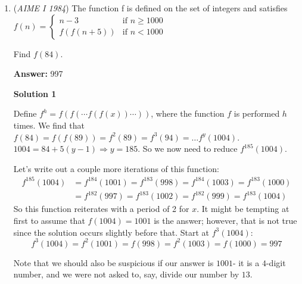 \begin{enumerate}
 Solution by \href{https://artofproblemsolving.com/wiki/index.php?title=User:A1b2}{a1b2}

 



\textbf{Solution 5 (Easy to understand)}

Notice that any line that passes through the bottom circle's center cuts it in half, so all we really care about are the top two circles. Suppose $\ell$ is the desired line. Draw lines $\ell_1$ and $\ell_2$ both parallel to $\ell$ such that $\ell_1$ passes through $(14,92)$ and $\ell_2$ passes through $(19,84)$. Clearly, $\ell$ must be the "average" of $\ell_1$ and $\ell_2$. Suppose $\ell:=y=mx+b, \ell_1:=y=mx+c, \ell_2:=y=mx+d$. Then $b=76-17m, c=92-14m, d=84-19m$. So we have that 
 \[76-17m=\frac{92-14m+84-19m}{2},\]which yields $m=-24$ for an answer of $\boxed{024}$.

 


	\item (\textit{AIME I 1984}) The function f is defined on the set of integers and satisfies
$f(n)= \begin{cases}  n-3 & \mbox{if }n\ge 1000 \\  f(f(n+5)) & \mbox{if }n<1000 \end{cases}$


 Find $f(84)$.


 
 \textbf{Answer: }997



\textbf{Solution 1}

Define $f^{h} = f(f(\cdots f(f(x))\cdots))$, where the function $f$ is performed $h$ times. We find that $f(84) = f(f(89)) = f^2(89) = f^3(94) = \ldots f^{y}(1004)$. $1004 = 84 + 5(y - 1) \Longrightarrow y = 185$. So we now need to reduce $f^{185}(1004)$.

 Let’s write out a couple more iterations of this function:
 \begin{align*}f^{185}(1004)&=f^{184}(1001)=f^{183}(998)=f^{184}(1003)=f^{183}(1000)\\ &=f^{182}(997)=f^{183}(1002)=f^{182}(999)=f^{183}(1004)\end{align*}
So this function reiterates with a period of 2 for $x$. It might be tempting at first to assume that $f(1004) = 1001$ is the answer; however, that is not true since the solution occurs slightly before that. Start at $f^3(1004)$:
 \[f^{3}(1004)=f^{2}(1001)=f(998)=f^{2}(1003)=f(1000)=\boxed{997}\]

 Note that we should also be suspicious if our answer is $1001$- it is a $4$-digit number, and we were not asked to, say, divide our number by $13$.


\end{enumerate}
